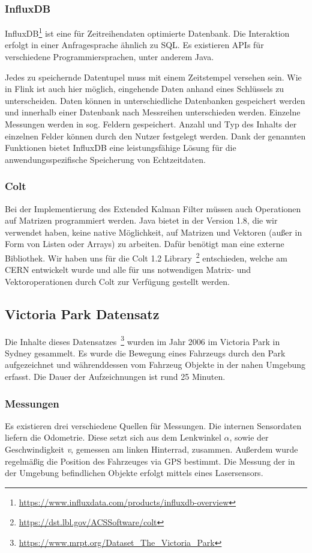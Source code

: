 \documentclass[11pt]{article}
\begin{document}
\subsubsection{InfluxDB}
InfluxDB\footnote{\url{https://www.influxdata.com/products/influxdb-overview}} ist eine für Zeitreihendaten optimierte Datenbank. Die Interaktion erfolgt in einer Anfragesprache ähnlich zu SQL. Es existieren APIs für verschiedene Programmiersprachen, unter anderem Java. 

Jedes zu speichernde Datentupel muss mit einem Zeitstempel versehen sein. Wie in Flink ist auch hier möglich, eingehende Daten anhand eines Schlüssels zu unterscheiden. Daten können in unterschiedliche Datenbanken gespeichert werden und innerhalb einer Datenbank nach Messreihen unterschieden werden. Einzelne Messungen werden in sog. Feldern gespeichert. Anzahl und Typ des Inhalts der einzelnen Felder können durch den Nutzer festgelegt werden. Dank der genannten Funktionen bietet InfluxDB eine leistungsfähige Lösung für die anwendungsspezifische Speicherung von Echtzeitdaten.

\subsubsection{Colt}
Bei der Implementierung des Extended Kalman Filter müssen auch Operationen auf Matrizen programmiert werden. Java bietet in der Version 1.8, die wir verwendet haben, keine native Möglichkeit, auf Matrizen und Vektoren (außer in Form von Listen oder Arrays) zu arbeiten. Dafür benötigt man eine externe Bibliothek. Wir haben  uns für die Colt 1.2 Library~\footnote{\url{https://dst.lbl.gov/ACSSoftware/colt}} entschieden, welche am CERN entwickelt wurde und alle für uns notwendigen Matrix- und Vektoroperationen durch Colt zur Verfügung gestellt werden.

\subsection{Victoria Park Datensatz}\label{Datensatz}
Die Inhalte dieses Datensatzes~\footnote{\url{https://www.mrpt.org/Dataset_The_Victoria_Park}} wurden im Jahr 2006 im Victoria Park in Sydney gesammelt. Es wurde die Bewegung eines Fahrzeugs durch den Park aufgezeichnet und währenddessen vom Fahrzeug Objekte in der nahen Umgebung erfasst. Die Dauer der Aufzeichnungen ist rund 25 Minuten.

\subsubsection{Messungen}
Es existieren drei verschiedene Quellen für Messungen. Die internen Sensordaten liefern die Odometrie. Diese setzt sich aus dem Lenkwinkel \(\alpha\), sowie der Geschwindigkeit \textit{v}, gemessen am linken Hinterrad, zusammen. Außerdem wurde regelmäßig die Position des Fahrzeuges via GPS bestimmt. Die Messung der in der Umgebung befindlichen Objekte erfolgt mittels eines Lasersensors.
\end{document}
